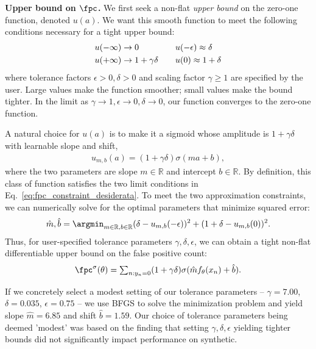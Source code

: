 \textbf{Upper bound on $\fpc$.}
We first seek a non-flat \emph{upper bound} on the zero-one function, denoted $u(a)$. We want this smooth function to meet the following conditions necessary for a tight upper bound:
\begin{align}
\label{eq:fpc_constraint_desiderata}
	u(-\infty)   &\rightarrow 0
\quad && 
	u(-\epsilon) \approx \delta 
\\ \notag 
	u(+\infty) &\rightarrow 1 + \gamma \delta
\quad &&
	u(0) \approx 1 + \delta
\end{align}
where tolerance factors $\epsilon > 0, \delta > 0$ and scaling factor $\gamma \geq 1$ are specified by the user. Large values make the function smoother; small values make the bound tighter. In the limit as $\gamma \rightarrow 1, \epsilon \rightarrow 0, \delta \rightarrow 0$, our function converges to the zero-one function. 

A natural choice for $u(a)$ is to make it a sigmoid whose amplitude is $1+\gamma \delta$ with learnable slope and shift,
\begin{align}
u_{m,b}(a) = (1+\gamma \delta) \sigma( m a + b)
\label{eq:fpc_bound_sigmoid_shift_and_scale},
\end{align}
where the two parameters are slope $m \in \mathbb{R}$ and intercept $b \in \mathbb{R}$. By definition, this class of function satisfies the two limit conditions in Eq.~\eqref{eq:fpc_constraint_desiderata}. To meet the two approximation constraints, we can numerically solve for the optimal parameters that minimize squared error:
\begin{align*}
\hat{m}, \hat{b} =
\argmin_{m \in \mathbb{R}, b \in \mathbb{R}} (\delta - u_{m,b}(-\epsilon) )^2 + (1 + \delta - u_{m,b}(0) )^2.
\end{align*}
Thus, for user-specified tolerance parameters $\gamma,\delta,\epsilon$, we can obtain a tight non-flat differentiable upper bound on the false positive count:
\begin{align}
\fpc^\sigma(\theta) = \textstyle \sum_{n : y_n = 0} (1+\gamma \delta) \sigma( \hat{m} f_{\theta}(x_n) + \hat{b}).
\label{eq:fpc_upper_bound}
\end{align}

If we concretely select a modest setting of our tolerance parameters -- $\gamma=7.00$, $\delta=0.035$, $\epsilon=0.75$ -- we use BFGS to solve the minimization problem and yield slope $\hat{m}=6.85$ and shift $\hat{b}=1.59$. Our choice of tolerance parameters being deemed 'modest' was based on the finding that setting $\gamma, \delta, \epsilon$ yielding tighter bounds did not significantly impact performance on synthetic.


